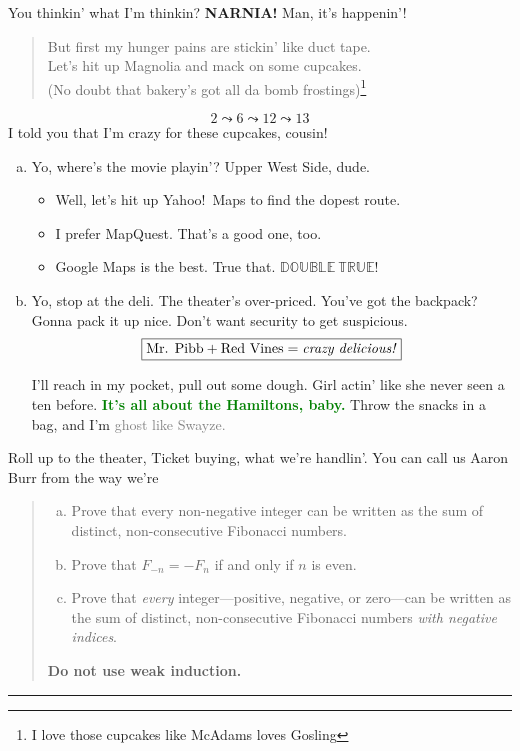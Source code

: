 \documentclass[11pt]{article}
\begin{document}
\begin{solution}

You thinkin’ what I’m thinkin? \textbf{NARNIA!}
Man, it’s happenin’!
\begin{quote}
\small
But first my hunger pains are stickin’ like duct tape.\\
Let’s hit up Magnolia and mack on some cupcakes.\\
(No doubt that bakery’s got all da bomb frostings)\footnote{I love those cupcakes like McAdams loves Gosling}
\end{quote}
\[
	2 \leadsto 6 \leadsto 12 \leadsto 13
\]
I told you that I’m crazy for these cupcakes, cousin!

\begin{enumerate}[(a)]
\item
Yo, where’s the movie playin’?  Upper West Side, dude.
\begin{itemize}
\item Well, let’s hit up Yahoo!~Maps to find the dopest route.
\item I prefer MapQuest. That’s a good one, too.
\item Google Maps is the best. True that.  $\mathbb{DOUBLE~TRUE}!$
\end{itemize}

\item
Yo, stop at the deli. The theater's over-priced. You've got the backpack? Gonna pack it up nice.  Don't want security to get suspicious.
\[
	\mfbox{\text{Mr. Pibb} + \text{Red Vines} = \text{\emph{crazy delicious!}}}
\]

I’ll reach in my pocket, pull out some dough.  Girl actin' like she never seen a ten before.  \textcolor{Green}{\textbf{It's all about the Hamiltons, baby.}} Throw the snacks in a bag, and I’m \textcolor{Gray}{ghost like Swayze.}

\end{enumerate}
Roll up to the theater, Ticket buying, what we’re handlin’.
You can call us Aaron Burr from the way we’re  
\end{solution}



\begin{quote}
\begin{enumerate}[(a)]\itemsep0pt
\item
Prove that every non-negative integer can be written as the sum of distinct, non-consecutive Fibonacci numbers.
\item
Prove that $F_{-n} = -F_n$ if and only if $n$ is even.
\item
Prove that \emph{every} integer---positive, negative, or zero---can be written as the sum of distinct, non-consecutive Fibonacci numbers \emph{with negative indices}.
\end{enumerate}
\textbf{Do not use weak induction.}
\end{quote}
\hrule
\end{document}
